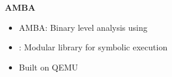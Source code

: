 \begin{frame}

	\begin{columns}[t]
		\begin{column}{0.6\textwidth}
			\textbf{AMBA}
			\small
			\begin{itemize}
                \item AMBA: Binary level analysis using \stoe{}
				\item \stoe{}: Modular library for symbolic execution
				\item Built on QEMU
			\end{itemize}
		\end{column}
	\end{columns}
\end{frame}
